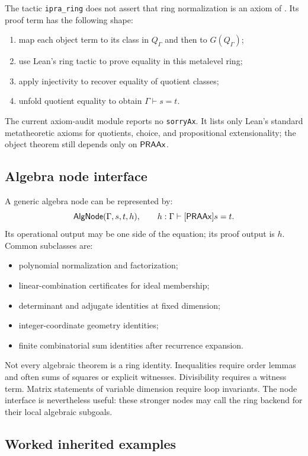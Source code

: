 The tactic \texttt{ipra\_ring} does not assert that ring normalization is an axiom of \iPRA.  Its proof term has the following shape:
\begin{enumerate}[label=(\arabic*)]
  \item map each object term to its class in \(Q_\Gamma\) and then to \(G(Q_\Gamma)\);
  \item use Lean's ring tactic to prove equality in this metalevel ring;
  \item apply injectivity to recover equality of quotient classes;
  \item unfold quotient equality to obtain \(\Gamma\vdash s=t\).
\end{enumerate}
The current axiom-audit module reports no \texttt{sorryAx}.  It lists only Lean's standard metatheoretic axioms for quotients, choice, and propositional extensionality; the object theorem still depends only on \(\mathsf{PRAAx}\).

\subsection{Algebra node interface}

A generic algebra node can be represented by:
\[
  \mathsf{AlgNode}(\Gamma,s,t,h),
  \qquad h:\Gamma\vdash[\mathsf{PRAAx}]s=t.
\]
Its operational output may be one side of the equation; its proof output is \(h\).  Common subclasses are:
\begin{itemize}
  \item polynomial normalization and factorization;
  \item linear-combination certificates for ideal membership;
  \item determinant and adjugate identities at fixed dimension;
  \item integer-coordinate geometry identities;
  \item finite combinatorial sum identities after recurrence expansion.
\end{itemize}

Not every algebraic theorem is a ring identity.  Inequalities require order lemmas and often sums of squares or explicit witnesses.  Divisibility requires a witness term.  Matrix statements of variable dimension require loop invariants.  The node interface is nevertheless useful: these stronger nodes may call the ring backend for their local algebraic subgoals.

\subsection{Worked inherited examples}

